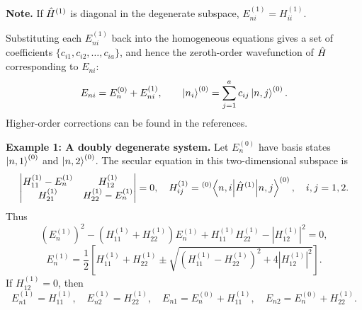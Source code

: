 \textbf{Note.} If $\hat{H}^{(1)}$ is diagonal in the degenerate subspace, $E_{ni}^{(1)}=H_{ii}^{(1)}$.

Substituting each $E_{ni}^{(1)}$ back into the homogeneous equations gives a set of coefficients $\{c_{i1},c_{i2},\ldots,c_{ia}\}$, and hence the zeroth-order wavefunction of $\hat{H}$ corresponding to $E_{ni}$:
\begin{equation}
 E_{ni}=E_n^{(0)}+E_{ni}^{(1)},\qquad
 \left|n_i\right\rangle^{(0)}=\sum_{j=1}^{a}c_{ij}\left|n,j\right\rangle^{(0)}.
\end{equation}
Higher-order corrections can be found in the references.

\textbf{Example 1: A doubly degenerate system.}
Let $E_n^{(0)}$ have basis states $\left|n,1\right\rangle^{(0)}$ and $\left|n,2\right\rangle^{(0)}$. The secular equation in this two-dimensional subspace is
\begin{equation}
 \begin{vmatrix}
 H_{11}^{(1)}-E_n^{(1)}&H_{12}^{(1)}\\
 H_{21}^{(1)}&H_{22}^{(1)}-E_n^{(1)}
 \end{vmatrix}=0,
 \quad
 H_{ij}^{(1)}={}^{(0)}\!\left\langle n,i\middle|\hat{H}^{(1)}\middle|n,j\right\rangle^{(0)},\quad i,j=1,2.
\end{equation}
Thus
\begin{equation}
 (E_n^{(1)})^2-(H_{11}^{(1)}+H_{22}^{(1)})E_n^{(1)}
 +H_{11}^{(1)}H_{22}^{(1)}-|H_{12}^{(1)}|^2=0,
\end{equation}
\begin{equation}
 E_n^{(1)}=\frac12\left[
 H_{11}^{(1)}+H_{22}^{(1)}
 \pm\sqrt{(H_{11}^{(1)}-H_{22}^{(1)})^2+4|H_{12}^{(1)}|^2}
 \right].
\end{equation}
If $H_{12}^{(1)}=0$, then
\begin{equation}
 E_{n1}^{(1)}=H_{11}^{(1)},\quad E_{n2}^{(1)}=H_{22}^{(1)},\quad
 E_{n1}=E_n^{(0)}+H_{11}^{(1)},\quad E_{n2}=E_n^{(0)}+H_{22}^{(1)}.
\end{equation}

